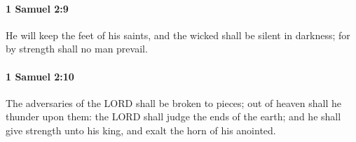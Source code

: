 		\paragraph{1 Samuel 2:9} %
			\label{1SAMUEL-2-9}

			He will keep the feet of his saints, and the wicked shall be silent in darkness; for by strength shall no man prevail.


		\paragraph{1 Samuel 2:10} %
			\label{1SAMUEL-2-10}

			The adversaries of the LORD shall be broken to pieces; out of heaven shall he thunder upon them: the LORD shall judge the ends of the earth; and he shall give strength unto his king, and exalt the horn of his anointed.


